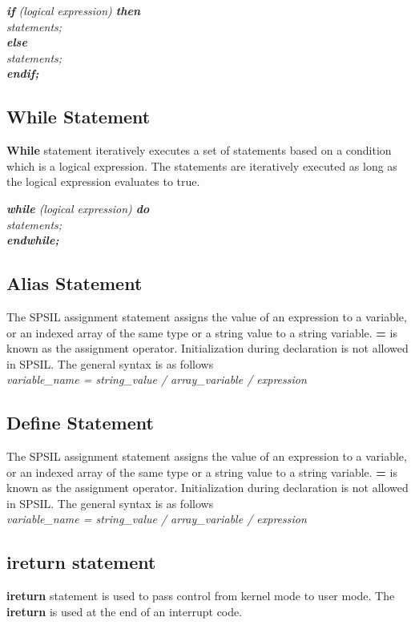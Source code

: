 \documentclass[11pt]{article}
\begin{document}
\textit{
\textbf{if} (logical expression) \textbf{then}  \\
 \indent \indent statements; \\
\indent \textbf{else} \\
\indent  \indent statements; \\
\indent \textbf{endif;}  \\
}



\subsection{While Statement}
\textbf{While} statement iteratively executes a set of statements based on a condition which is a logical expression.  The statements are iteratively executed as long as the logical expression evaluates to true.

\textit{
\textbf{while} (logical expression) \textbf{do}  \\
 \indent \indent statements; \\
\indent \textbf{endwhile;}  \\
}


\subsection{Alias Statement}
The SPSIL assignment statement assigns the value of an expression to a variable, or an indexed array of the same type or a string value to a string variable. \textbf{=} is known as the assignment operator. Initialization during declaration is not allowed in SPSIL. The general syntax is as follows \\
\textit{ variable\_name = string\_value / array\_variable / expression }


\subsection{Define Statement}
The SPSIL assignment statement assigns the value of an expression to a variable, or an indexed array of the same type or a string value to a string variable. \textbf{=} is known as the assignment operator. Initialization during declaration is not allowed in SPSIL. The general syntax is as follows \\
\textit{ variable\_name = string\_value / array\_variable / expression }



\subsection{ireturn statement}
\textbf{ireturn} statement is used to pass control from kernel mode to user mode. The \textbf{ireturn} is used at the end of an interrupt code.
\end{document}
